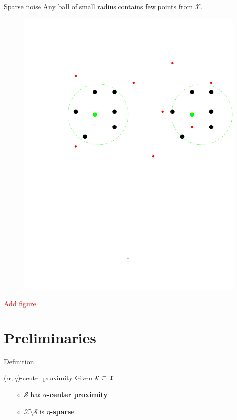 \documentclass{beamer}
\newcommand{\mc}{\mathcal}
\begin{document}
\begin{frame}{Sparse noise}
    Any ball of small radius contains few points from $\mc X$.
    \begin{figure}
	  \includegraphics[trim = 100 0 0 100, clip, width=\linewidth]{2.pdf}
   \end{figure}
    	 
	\textcolor{red}{Add figure}
\end{frame}

\section{Preliminaries}

\begin{frame}{Definition}
	\begin{block}{($\alpha, \eta$)-center proximity}
	Given $\mc S \subseteq \mc X$
	\begin{itemize}
  	\item[$\diamond$] $\mc S$ has {\bf $\alpha$-center proximity}
	\item[$\diamond$]$\mc X \setminus \mc S$ is {\bf $\eta$-sparse}
	\end{itemize}
	\end{block}
\end{frame}
\end{document}

